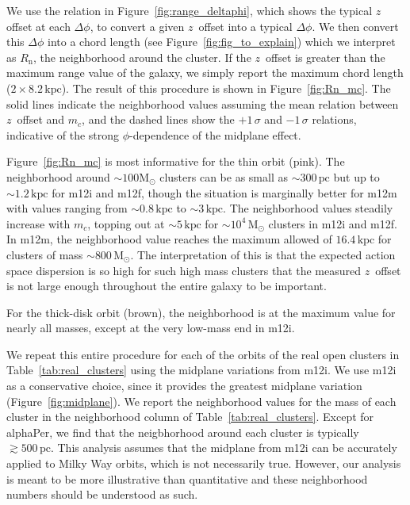 \documentclass[twocolumn]{aastex62}
\newcommand{\Msun}{\ensuremath{\text{M}_\odot}}
\newcommand{\pc}{\text{pc}}
\newcommand{\kpc}{\text{kpc}}
\newcommand{\n}{\text{n}}
\newcommand{\thincolor}{pink}
\begin{document}
We use the relation in Figure~\ref{fig:range_deltaphi}, which shows the
typical $z$ offset at each $\Delta \phi$, to convert a given $z$~offset into a
typical $\Delta\phi$. We then convert this $\Delta \phi$ into a chord length
(see Figure~\ref{fig:fig_to_explain}) which we interpret as $R_{\n}$, the
neighborhood around the cluster. If the $z$~offset is greater than the maximum
range value of the galaxy, we simply report the maximum chord length
($2\times8.2\,\kpc$). The result of this procedure is shown in
Figure~\ref{fig:Rn_mc}. The solid lines indicate the neighborhood values
assuming the mean relation between $z$~offset and $m_c$, and the dashed lines
show the $+1\,\sigma$ and $-1\,\sigma$ relations, indicative of the strong
$\phi$-dependence of the midplane effect.

Figure~\ref{fig:Rn_mc} is most informative for the thin orbit (\thincolor).
The neighborhood around $\sim100\Msun$ clusters can be as small as
$\sim300\,\pc$ but up to $\sim1.2\,\kpc$ for m12i and m12f, though the
situation is marginally better for m12m with values ranging from
$\sim0.8\,\kpc$ to $\sim3\,\kpc$. The neighborhood values steadily increase
with $m_c$, topping out at $\sim5\,\kpc$ for $\sim10^4\,\Msun$ clusters in
m12i and m12f. In m12m, the neighborhood value reaches the maximum allowed of
$16.4\,\kpc$ for clusters of mass $\sim800\,\Msun$. The interpretation of this
is that the expected action space dispersion is so high for such high mass
clusters that the measured $z$~offset is not large enough throughout the
entire galaxy to be important.

For the thick-disk orbit (brown), the neighborhood is at the maximum value for
nearly all masses, except at the very low-mass end in m12i.

We repeat this entire procedure for each of the orbits of the real open
clusters in Table~\ref{tab:real_clusters} using the midplane variations from
m12i. We use m12i as a conservative choice, since it provides the greatest
midplane variation (Figure~\ref{fig:midplane}). We report the neighborhood
values for the mass of each cluster in the neighborhood column of
Table~\ref{tab:real_clusters}. Except for alphaPer, we find that the
neigbhorhood around each cluster is typically $\gtrsim 500\,\pc$. This
analysis assumes that the midplane from m12i can be accurately applied to
Milky Way orbits, which is not necessarily true. However, our analysis is
meant to be more illustrative than quantitative and these neighborhood numbers
should be understood as such.
\end{document}

